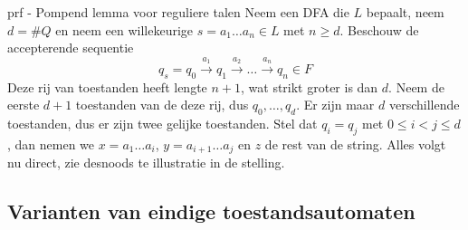 \begin{prf}{prf - Pompend lemma voor reguliere talen}
    Neem een DFA die $L$ bepaalt, neem $d = \#Q$ en neem een willekeurige $s = a_1 \ldots a_n \in L$ met $n \geq d$.
    Beschouw de accepterende sequentie
    \begin{equation*}
        q_s = q_0 \overset{a_1}{\to} q_1 \overset{a_2}{\to} \ldots \overset{a_n}{\to} q_n \in F
    \end{equation*}
    Deze rij van toestanden heeft lengte $n+1$, wat strikt groter is dan $d$. Neem de eerste $d+1$ toestanden van de deze rij,
    dus $q_0,\ldots, q_d$. Er zijn maar $d$ verschillende toestanden, dus er zijn twee gelijke toestanden. 
    Stel dat $q_i = q_j$ met $ 0 \leq i < j \leq d$, dan nemen we $x = a_1 \ldots a_i$, $y = a_{i+1} \ldots a_j$ en $z$ de rest van de string. 
    Alles volgt nu direct, zie desnoods te illustratie in de stelling.
\end{prf}

\subsection{Varianten van eindige toestandsautomaten}

\vspace{0.5cm}

